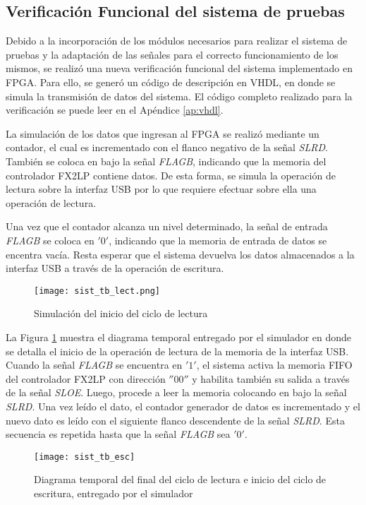 \subsection{Verificación Funcional del sistema de pruebas}
	Debido a la incorporación de los módulos necesarios para realizar el sistema de pruebas y la adaptación de las señales para el correcto funcionamiento de los mismos, se realizó una nueva verificación funcional del sistema implementado en FPGA. Para ello, se generó un código de descripción en VHDL, en donde se simula la transmisión de datos del sistema. El código completo realizado para la verificación se puede leer en el Apéndice \ref{ap:vhdl}.
	
	La simulación de los datos que ingresan al FPGA se realizó mediante un contador, el cual es incrementado con el flanco negativo de la señal \textit{SLRD}. También se coloca en bajo la señal \textit{FLAGB}, indicando que la memoria del controlador FX2LP contiene datos. De esta forma, se simula la operación de lectura sobre la interfaz USB por lo que requiere efectuar sobre ella una operación de lectura.
	
	Una vez que el contador alcanza un nivel determinado, la señal de entrada \textit{FLAGB} se coloca en $'0'$, indicando que la memoria de entrada de datos se encentra vacía. Resta esperar que el sistema devuelva los datos almacenados a la interfaz USB a través de la operación de escritura.
	
	\begin{figure}[t]
		\centering
		\texttt{[image: sist\_tb\_lect.png]}
		\caption{Simulación del inicio del ciclo de lectura}
		\label{test:tb:lect}
	\end{figure}

	La Figura \ref{test:tb:lect} muestra el diagrama temporal entregado por el simulador en donde se detalla el inicio de la operación de lectura de la memoria de la interfaz USB. Cuando la señal \textit{FLAGB} se encuentra en $'1'$, el sistema activa la memoria FIFO del controlador FX2LP con dirección $''00''$ y habilita también su salida a través de la señal \textit{SLOE}. Luego, procede a leer la memoria colocando en bajo la señal \textit{SLRD}. Una vez leído el dato, el contador generador de datos es incrementado y el nuevo dato es leído con el siguiente flanco descendente de la señal \textit{SLRD}. Esta secuencia es repetida hasta que la señal \textit{FLAGB} sea $'0'$.
	
	\begin{figure}[b]
		\centering
		\texttt{[image: sist\_tb\_esc]}
		\caption{Diagrama temporal del final del ciclo de lectura e inicio del ciclo de escritura, entregado por el simulador}
		\label{test:tb:escr}
	\end{figure}

